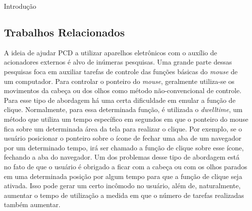 \begin{chapter}{Introdução}
\subsection{Trabalhos Relacionados}
A ideia de ajudar PCD a utilizar aparelhos eletrônicos com o auxílio de 
acionadores externos é alvo de inúmeras pesquisas. Uma grande parte dessas
pesquisas foca em auxiliar tarefas de controle das funções básicas do
\textit{mouse} de um computador. Para controlar o ponteiro do \textit{mouse},
geralmente utiliza-se os movimentos da cabeça ou dos olhos como método
não-convencional de controle. Para esse tipo de abordagem há uma certa
dificuldade em emular a função de clique.  Normalmente, para essa determinada
função,  é utilizada o \textit{dwelltime}, um método que utiliza um tempo
específico em segundos em que o ponteiro do mouse fica sobre um determinada área
da tela para realizar  o clique. Por exemplo, se o usuário posicionar o ponteiro
sobre o ícone de fechar uma aba de um navegador por um determinado tempo, irá
ser chamado a função de clique sobre esse ícone, fechando a aba do navegador. Um
dos problemas desse tipo de abordagem está no fato de que o usuário é obrigado a
ficar com a cabeça ou com os olhos parados em uma determinada posição por algum
tempo para que a função de clique seja ativada. Isso pode gerar um certo incômodo
no usuário, além de, naturalmente, aumentar o tempo de utilização a medida em
que o número de tarefas realizadas também aumentar.


\end{chapter}
